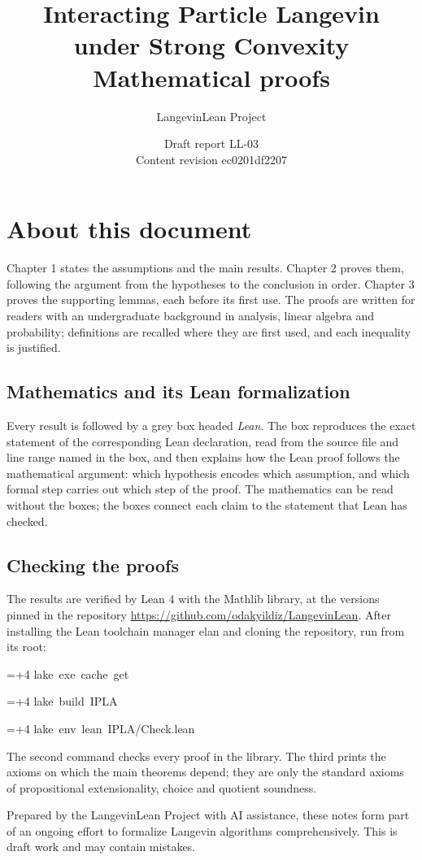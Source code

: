\documentclass[11pt,a4paper]{report}
\title{\texorpdfstring{Interacting Particle Langevin under Strong Convexity}{Interacting Particle Langevin under Strong Convexity}\\[0.6em]\large Mathematical proofs}
\author{LangevinLean Project}
\date{Draft report LL-03\\[0.4em]\small Content revision ec0201df2207}
\newlength{\leancharwidth}
\newenvironment{leancode}{\par\smallskip\begingroup\ttfamily\footnotesize\raggedright
  \settowidth{\leancharwidth}{M}\setlength{\parskip}{0pt}\setlength{\parindent}{0pt}
  \frenchspacing}{\par\endgroup\smallskip}
\newcommand{\leanline}[2]{\hangindent=\dimexpr#1\leancharwidth+4\leancharwidth\relax
  \hangafter=1\noindent\hspace*{#1\leancharwidth}#2\par}
\begin{document}
\maketitle
\chapter*{About this document}
Chapter 1 states the assumptions and the main results. Chapter 2 proves them, following the argument from the hypotheses to the conclusion in order. Chapter 3 proves the supporting lemmas, each before its first use. The proofs are written for readers with an undergraduate background in analysis, linear algebra and probability; definitions are recalled where they are first used, and each inequality is justified.

\section*{Mathematics and its Lean formalization}
Every result is followed by a grey box headed \emph{Lean}. The box reproduces the exact statement of the corresponding Lean declaration, read from the source file and line range named in the box, and then explains how the Lean proof follows the mathematical argument: which hypothesis encodes which assumption, and which formal step carries out which step of the proof. The mathematics can be read without the boxes; the boxes connect each claim to the statement that Lean has checked.

\section*{Checking the proofs}
The results are verified by Lean 4 with the Mathlib library, at the versions pinned in the repository \url{https://github.com/odakyildiz/LangevinLean}. After installing the Lean toolchain manager elan and cloning the repository, run from its root:
\begin{leancode}
\leanline{0}{lake\ exe\ cache\ get}
\leanline{0}{lake\ build\ IPLA}
\leanline{0}{lake\ env\ lean\ IPLA/Check.lean}
\end{leancode}
The second command checks every proof in the library. The third prints the axioms on which the main theorems depend; they are only the standard axioms of propositional extensionality, choice and quotient soundness.

Prepared by the LangevinLean Project with AI assistance, these notes form part of an ongoing effort to formalize Langevin algorithms comprehensively. This is draft work and may contain mistakes.
\end{document}
